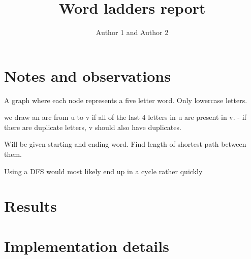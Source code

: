 \documentclass{article}
\title{Word ladders report}
\author{Author 1 and Author 2}
\begin{document}
  \maketitle

  \section{Notes and observations}
  A graph where each node represents a five letter word. Only lowercase letters.

  we draw an arc from u to v if all of the last 4 letters in u are present in v.
    - if there are duplicate letters, v should also have duplicates.

  Will be given starting and ending word. Find length of shortest path between them.


  Using a DFS would most likely end up in a cycle rather quickly

  
  \section{Results}


  \section{Implementation details}

\end{document}
